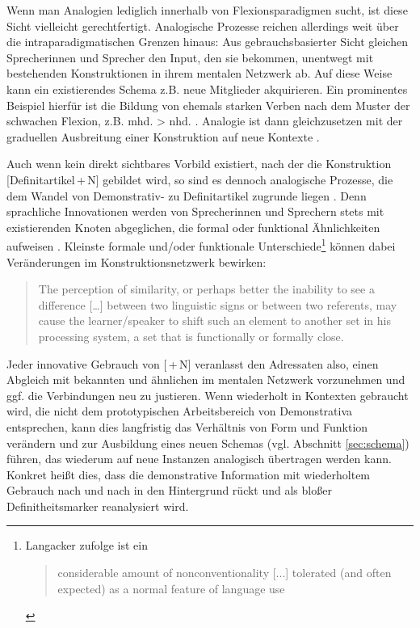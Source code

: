 Wenn man Analogien lediglich innerhalb von Flexionsparadigmen sucht, ist diese Sicht vielleicht gerechtfertigt. Analogische Prozesse reichen allerdings weit über die intraparadigmatischen Grenzen hinaus: Aus gebrauchsbasierter Sicht gleichen Sprecherinnen und Sprecher den Input, den sie bekommen, unentwegt mit bestehenden Konstruktionen in ihrem mentalen Netzwerk ab. Auf diese Weise kann ein existierendes Schema z.B. neue Mitglieder akquirieren. Ein prominentes Beispiel hierfür ist die Bildung von ehemals starken Verben nach dem Muster der schwachen Flexion, z.B. mhd.  > nhd.  \parencite{Bittner1985}. Analogie ist dann gleichzusetzen mit der graduellen Ausbreitung einer Konstruktion auf neue Kontexte \parencite[57-58]{Bybee2010}. %

Auch wenn kein direkt sichtbares Vorbild existiert, nach der die Konstruktion [Definitartikel\,+\,N] gebildet wird, so sind es dennoch analogische Prozesse, die dem  Wandel von Demonstrativ- zu Definitartikel zugrunde liegen \parencite[eine ähnliche Perspektive nimmt auch Sommerer bei der Entwicklung des engl. Definitartikels ein, s.][]{Sommerer2011}. Denn sprachliche Innovationen werden von Sprecherinnen und Sprechern stets mit existierenden Knoten abgeglichen, die formal oder funktional Ähnlichkeiten aufweisen \parencite[51]{Traugott2013}. Kleinste formale und/oder funktionale Unterschiede\footnote{Langacker zufolge ist ein \blockcquote[69]{Langacker1987}{considerable amount of nonconventionality [...] tolerated (and often expected) as a normal feature of language use}.}
 können dabei Veränderungen im Konstruktionsnetzwerk bewirken:  \blockcquote[324]{Fischer2007} {The perception of similarity, or perhaps better the inability to see a difference […] between two linguistic signs or between two referents, may cause the learner/speaker to shift such an element to another set in his processing system, a set that is functionally or formally close.} Jeder innovative Gebrauch von [\,+\,N] veranlasst den Adressaten also, einen Abgleich mit bekannten und ähnlichen  \parencite[60]{Bybee2010} im mentalen Netzwerk vorzunehmen und ggf. die Verbindungen neu zu justieren. Wenn  wiederholt in Kontexten gebraucht wird, die nicht dem prototypischen Arbeitsbereich von Demonstrativa entsprechen, kann dies langfristig das Verhältnis von Form und Funktion verändern und zur Ausbildung eines neuen Schemas (vgl. Abschnitt \ref{sec:schema}) führen, das wiederum auf neue Instanzen analogisch übertragen werden kann. Konkret heißt dies, dass die demonstrative Information mit wiederholtem Gebrauch nach und nach in den Hintergrund rückt und  als bloßer Definitheitsmarker reanalysiert wird.

